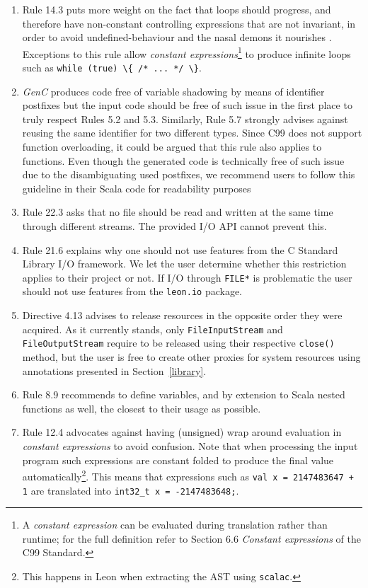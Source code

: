 \documentclass[a4paper,twoside]{article}
\newcommand{\Inline}[1]{\lstinline[basicstyle=\ttfamily]|#1|}
\newcommand{\InlineC}[1]{\lstinline[language=C99]|#1|}
\newcommand{\InlineS}[1]{\lstinline[language=Leon]|#1|}
\newcommand{\GenC}{\emph{GenC}\xspace}
\newcommand{\RefSec}[1]{Section~\ref{#1}}
\begin{document}
\begin{enumerate}
\item Rule 14.3 puts more weight on the fact that loops should progress, and
therefore have non-constant controlling expressions that are not invariant, in
order to avoid undefined-behaviour and the nasal demons it nourishes
\cite{spencer}. Exceptions to this rule allow \emph{constant
expressions}\footnote{A \emph{constant expression} can be evaluated during
translation rather than runtime; for the full definition refer to Section 6.6
\emph{Constant expressions} of the C99 Standard.} to produce infinite loops such
as \InlineC{while (true) \{ /* ... */ \}}.

\item \GenC produces code free of variable shadowing by means of identifier
postfixes but the input code should be free of such issue in the first place to
truly respect Rules 5.2 and 5.3. Similarly, Rule 5.7 strongly advises against
reusing the same identifier for two different types. Since C99 does not support
function overloading, it could be argued that this rule also applies to
functions. Even though the generated code is technically free of such issue due
to the disambiguating used postfixes, we recommend users to follow this
guideline in their Scala code for readability purposes

\item Rule 22.3 asks that no file should be read and written at the same time
through different streams. The provided I/O API cannot prevent this.

\item Rule 21.6 explains why one should not use features from the C Standard
Library I/O framework. We let the user determine whether this restriction
applies to their project or not. If I/O through \InlineC{FILE*} is problematic
the user should not use features from the \InlineS{leon.io} package.

\item Directive 4.13 advises to release resources in the opposite order they
were acquired. As it currently stands, only \InlineS{FileInputStream} and
\InlineS{FileOutputStream} require to be released using their respective
\InlineS{close()} method, but the user is free to create other proxies for
system resources using annotations presented in \RefSec{library}.

\item Rule 8.9 recommends to define variables, and by extension to Scala nested
functions as well, the closest to their usage as possible.

\item Rule 12.4 advocates against having (unsigned) wrap around evaluation in
\emph{constant expressions} to avoid confusion. Note that when processing the
input program such expressions are constant folded to produce the final value
automatically\footnote{This happens in Leon when extracting the AST using
\Inline{scalac}.}. This means that expressions such as \InlineS{val x =
2147483647 + 1} are translated into \InlineC{int32_t x = -2147483648;}.


\end{enumerate}
\end{document}
